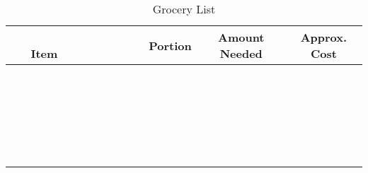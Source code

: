 \documentclass[14pt,english]{extarticle}
\begin{document}
\begin{table}[h!]
	\caption{Grocery List}
	\centering
	\bigskip
	\begin{tabular}{c|c|c|c}
		\hline
		\,\,\,\,\,\,\,\,\,\,\,\,\,\,\,\,\,\,\,\,\,\,\,\,\,\,\,\,\,\,\,\,Item\,\,\,\,\,\,\,\,\,\,\,\,\,\,\,\,\,\,\,\,\,\,\,\,\,\,\,\,\,\,\,\, & Portion & Amount Needed & Approx. Cost \\ \hline
		 & & & \\ \hline
		 & & & \\ \hline
		 & & & \\ \hline
		 & & & \\ \hline
		 & & & \\ \hline
		 & & & \\ \hline
		 & & & \\ \hline
		 & & & \\ \hline
		 & & & \\ \hline
		 & & & \\ \hline
		 & & & \\ \hline
		 & & & \\ \hline
		 & & & \\ \hline
		 & & & \\ \hline
		 & & & \\ \hline
		 & & & \\ \hline
		 & & & \\ \hline
		 & & & \\ \hline
		 & & & \\ \hline
		 & & & \\ \hline
		 & & & \\ \hline
		 & & & \\ \hline
		 & & & \\ \hline
		 & & & \\
		\hline
	\end{tabular}
	\label{tab:list}
\end{table}
\end{document}
